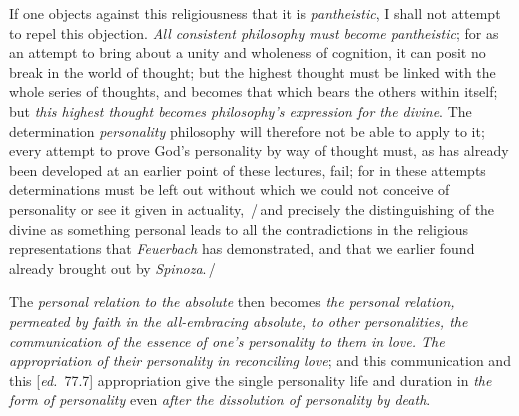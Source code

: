 \documentclass[12pt,a4paper,openany]{book}
\newcommand{\ed}[1]{{\small[\textit{ed.}\ #1]}}
\newcommand{\ins}[1]{\,/\,#1\,/\,}
\begin{document}
If one objects against this religiousness that it is \emph{pantheistic},
I shall not attempt to repel this objection. \emph{All consistent philosophy
must become pantheistic}; for as an attempt to bring about a unity and wholeness
of cognition, it can posit no break in
the world of thought; but the highest thought must be linked
with the whole series of thoughts, and becomes that which bears the others within itself;
but \emph{this highest thought becomes philosophy's expression for the divine}. The determination
\emph{personality} philosophy will therefore not be able to apply
to it; every attempt to prove God's personality by way of thought
must, as has already been developed at an earlier point of these lectures,
fail; for in these attempts determinations must be
left out without which we could not conceive of personality
or see it given in actuality, \ins{and precisely the distinguishing of the
divine as something personal leads to all the contradictions in the
religious representations that \emph{Feuerbach} has demonstrated, and that we
earlier found already brought out by \emph{Spinoza}.}

The \emph{personal relation to the absolute} then becomes \emph{the personal relation, permeated by faith in
the all-embracing absolute, to other personalities, the communication
of the essence of one's personality to them in love. The appropriation of their personality
in reconciling love}; and this communication and this \ed{77.7}
appropriation give the single personality life and duration in \emph{the form of
personality} even \emph{after the dissolution of personality by death}.
\end{document}
